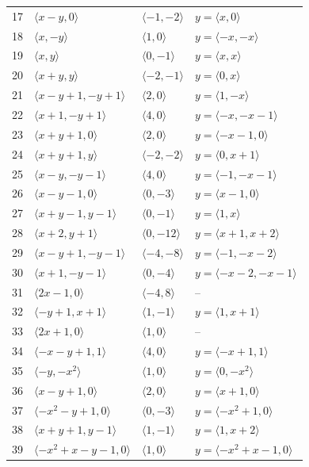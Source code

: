 \documentclass[11pt]{article}
\begin{document}
\begin{longtable}{@{}rlll@{}}
17 & $\langle x-y,0\rangle$ & $\langle -1,-2\rangle$ & $y=\langle x,0\rangle$\\
18 & $\langle x,-y\rangle$ & $\langle 1,0\rangle$ & $y=\langle -x,-x\rangle$\\
19 & $\langle x,y\rangle$ & $\langle 0,-1\rangle$ & $y=\langle x,x\rangle$\\
20 & $\langle x+y,y\rangle$ & $\langle -2,-1\rangle$ & $y=\langle 0,x\rangle$\\
21 & $\langle x-y+1,-y+1\rangle$ & $\langle 2,0\rangle$ & $y=\langle 1,-x\rangle$\\
22 & $\langle x+1,-y+1\rangle$ & $\langle 4,0\rangle$ & $y=\langle -x,-x-1\rangle$\\
23 & $\langle x+y+1,0\rangle$ & $\langle 2,0\rangle$ & $y=\langle -x-1,0\rangle$\\
24 & $\langle x+y+1,y\rangle$ & $\langle -2,-2\rangle$ & $y=\langle 0,x+1\rangle$\\
25 & $\langle x-y,-y-1\rangle$ & $\langle 4,0\rangle$ & $y=\langle -1,-x-1\rangle$\\
26 & $\langle x-y-1,0\rangle$ & $\langle 0,-3\rangle$ & $y=\langle x-1,0\rangle$\\
27 & $\langle x+y-1,y-1\rangle$ & $\langle 0,-1\rangle$ & $y=\langle 1,x\rangle$\\
28 & $\langle x+2,y+1\rangle$ & $\langle 0,-12\rangle$ & $y=\langle x+1,x+2\rangle$\\
29 & $\langle x-y+1,-y-1\rangle$ & $\langle -4,-8\rangle$ & $y=\langle -1,-x-2\rangle$\\
30 & $\langle x+1,-y-1\rangle$ & $\langle 0,-4\rangle$ & $y=\langle -x-2,-x-1\rangle$\\
31 & $\langle 2x-1,0\rangle$ & $\langle -4,8\rangle$ & --\\
32 & $\langle -y+1,x+1\rangle$ & $\langle 1,-1\rangle$ & $y=\langle 1,x+1\rangle$\\
33 & $\langle 2x+1,0\rangle$ & $\langle 1,0\rangle$ & --\\
34 & $\langle -x-y+1,1\rangle$ & $\langle 4,0\rangle$ & $y=\langle -x+1,1\rangle$\\
35 & $\langle -y,-x^{2}\rangle$ & $\langle 1,0\rangle$ & $y=\langle 0,-x^{2}\rangle$\\
36 & $\langle x-y+1,0\rangle$ & $\langle 2,0\rangle$ & $y=\langle x+1,0\rangle$\\
37 & $\langle -x^{2}-y+1,0\rangle$ & $\langle 0,-3\rangle$ & $y=\langle -x^{2}+1,0\rangle$\\
38 & $\langle x+y+1,y-1\rangle$ & $\langle 1,-1\rangle$ & $y=\langle 1,x+2\rangle$\\
39 & $\langle -x^{2}+x-y-1,0\rangle$ & $\langle 1,0\rangle$ & $y=\langle -x^{2}+x-1,0\rangle$\\
\end{longtable}
\endgroup
\end{document}
